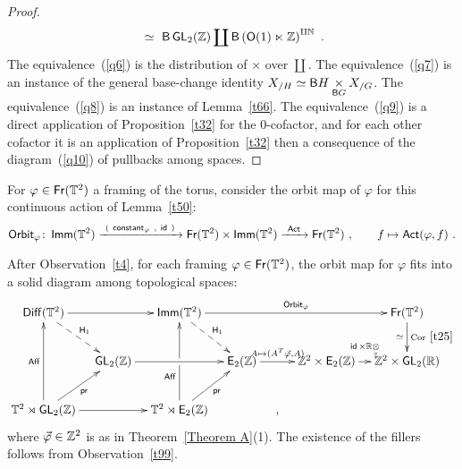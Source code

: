\begin{proof}
\[~\simeq~
\mathsf B \operatorname{\sf GL}_2(\mathbb Z)
\coprod
\mathsf B
\left(
\mathsf O(1) \ltimes \mathbb Z
\right)^{ \amalg \mathbb N}
~.
\]
The equivalence~(\ref{q6}) is the distribution of $\times$ over $\coprod$.  
The equivalence~(\ref{q7}) is an instance of the general base-change identity $X_{/H}\simeq \mathsf B H \underset{\mathsf B G} \times X_{/G}$.
The equivalence~(\ref{q8}) is an instance of Lemma~\ref{t66}.
The equivalence~(\ref{q9}) is a direct application of Proposition~\ref{t32} for the $0$-cofactor, 
and for each other cofactor it is an application of Proposition~\ref{t32} then a consequence of the diagram~(\ref{q10}) of pullbacks among spaces.



\end{proof}












For $\varphi\in \operatorname{\sf Fr}(\mathbb T^2)$ a framing of the torus, consider the orbit map of $\varphi$ for this continuous action of Lemma~\ref{t50}:
\[
{\sf Orbit}_\varphi
\colon
\operatorname{\sf Imm}(\mathbb T^2)
\xrightarrow{~( ~ {\sf constant}_{\varphi}~ , ~\operatorname{\sf id} ~ )~}
\operatorname{\sf Fr}(\mathbb T^2)
\times 
\operatorname{\sf Imm}(\mathbb T^2)
\xrightarrow{~{\sf Act}~}
\operatorname{\sf Fr}(\mathbb T^2)
~,\qquad
f
\mapsto {\sf Act}(\varphi , f)
~.
\]







\begin{observation}
\label{t33}
After Observation~\ref{t4}, for each framing $\varphi \in \operatorname{\sf Fr}(\mathbb T^2)$, 
the orbit map for $\varphi$ fits into a solid diagram among topological spaces:
\begin{equation*}
\xymatrix@C=1em{
\Diff(\TT^2) 
\ar[rr]
\ar@{-->}[dr]^-{\sH_1}
&&
\Imm(\TT^2)
\ar[rrrr]^-{{\sf Orbit}_\varphi}
\ar@{-->}[dr]^-{\sH_1}
&&
&&
\Fr(\TT^2)
\ar[d]^-{{\rm Cor}~\ref{t25}}_-{\simeq}
\\
&
\GL_2(\ZZ) 
\ar[rr] 
&&
\EZ
\ar[rr]^-{ A \mapsto (A^T \vec{\varphi} , A) }
&&
\ZZ^2 \times \EZ
\ar[r]^-{\id \times \RR\underset{\ZZ}\ot }
&
\ZZ^2 \times \GL_2(\RR)
\\
\TT^2 \rtimes \GL_2(\ZZ)
\ar[uu]^-{\Aff}
\ar[rr]
\ar[ur]_-{\pr}
&&
\TT^2 \rtimes \EZ
\ar[uu]^(.35){\Aff} | \hole
\ar[ur]_-{\pr}
&&
,
}
\end{equation*}
where $\vec{\varphi} \in \mathbb Z^2$ is as in Theorem~\ref{Theorem A}(1).
The existence of the fillers follows from Observation~\ref{t99}.



\end{observation}






















